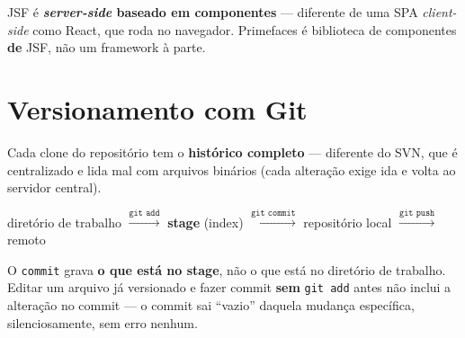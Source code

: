 \begin{cuidado}
JSF é \textbf{\textit{server-side} baseado em componentes} --- diferente
de uma SPA \textit{client-side} como React, que roda no navegador.
Primefaces é biblioteca de componentes \textbf{de} JSF, não um framework
à parte.
\end{cuidado}

\section{Versionamento com Git}
\label{sec:git-devops-teoria}

\begin{conceito}
Cada clone do repositório tem o \textbf{histórico completo} --- diferente
do SVN, que é centralizado e lida mal com arquivos binários (cada
alteração exige ida e volta ao servidor central).
\end{conceito}

\begin{conceito}
\begin{center}
diretório de trabalho $\xrightarrow{\texttt{git add}}$ \textbf{stage}
(index) $\xrightarrow{\texttt{git commit}}$ repositório local
$\xrightarrow{\texttt{git push}}$ remoto
\end{center}

O \texttt{commit} grava \textbf{o que está no stage}, não o que está no
diretório de trabalho. Editar um arquivo já versionado e fazer commit
\textbf{sem} \texttt{git add} antes não inclui a alteração no commit --- o
commit sai “vazio” daquela mudança específica, silenciosamente, sem
erro nenhum.
\end{conceito}

